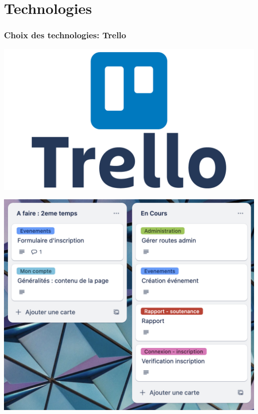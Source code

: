 \section{Technologies}

\begin{frame}
    \frametitle{Choix des technologies: Trello}

    \begin{minipage}{0.48\textwidth}
        \centering
        \includegraphics[width=\linewidth]{pictures/trello.png}
    \end{minipage}
    \hfill
    \begin{minipage}{0.48\textwidth}
        \centering
        \includegraphics[width=\linewidth]{pictures/trello_screen.png}
    \end{minipage}

    \bigskip


\end{frame}

